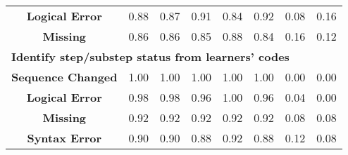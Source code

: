 \begin{table*}[hbpt]
\begin{small}
\begin{tabular}{c | c c c c c c c}
 \rowcolor{gray!15}\textbf{Logical Error}&0.88&0.87&0.91&0.84&0.92&0.08&0.16\\
	    \textbf{Missing}&0.86&0.86&0.85&0.88&0.84&0.16&0.12 \\

 \hline
\multicolumn{8}{l}{\textbf{Identify step/substep status from learners' codes}}\\
\hline
    \rowcolor{gray!15}\textbf{Sequence Changed}&1.00&1.00&1.00&1.00&1.00&0.00&0.00\\

	\textbf{Logical Error}&0.98&0.98&0.96&1.00&0.96&0.04&0.00\\

 
    \rowcolor{gray!15}\textbf{Missing}&0.92&0.92&0.92&0.92&0.92&0.08&0.08\\


    \textbf{Syntax Error}&0.90&0.90&0.88&0.92&0.88&0.12&0.08\\
	    \hline
	\end{tabular}%
	\end{small}
\end{table*}






